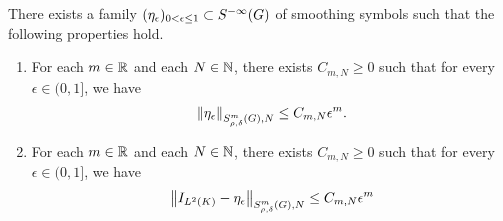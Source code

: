 \begin{corollary}
    There exists a family $(\eta_\epsilon)_{0 < \epsilon \leq 1} \subset \SmoothingSymbols$ of smoothing symbols
    such that the following properties hold.
    \begin{enumerate}
        \item For each $m \in \R$ and each $N \in \N$,
            there exists $C_{m, N} \geq 0$ such that for every $\epsilon \in (0, 1]$,
            we have
            \begin{align*}
                \SymbolSemiNorm m {\rho, \delta} N {\eta_\epsilon} \leq C_{m, N} \epsilon^m.
            \end{align*}
        \item For each $m \in \R$ and each $N \in \N$,
            there exists $C_{m, N} \geq 0$ such that for every $\epsilon \in (0, 1]$,
            we have
            \begin{align*}
                \SymbolSemiNorm m {\rho, \delta} N {\Id {\Lebesgue 2 \CompactGroup} - \eta_\epsilon} \leq C_{m, N} \epsilon^m
            \end{align*}
    \end{enumerate}
\end{corollary}
